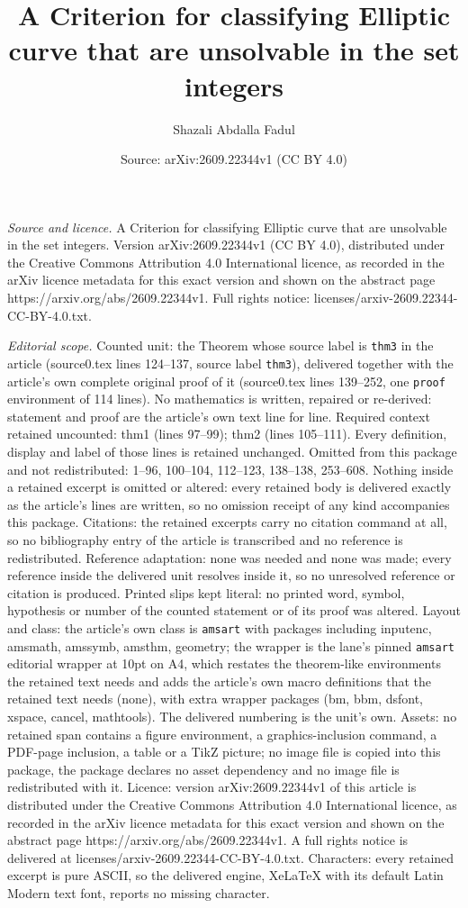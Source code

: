 \documentclass[10pt,a4paper]{amsart}
\title[A Criterion for classifying Elliptic curve that are unsolvab]{A Criterion for classifying Elliptic curve that are unsolvable in the set integers}
\author{Shazali Abdalla Fadul}
\date{Source: arXiv:2609.22344v1 (CC BY 4.0)}
\begin{document}
\maketitle

\noindent\emph{Source and licence.} A Criterion for classifying Elliptic curve that are unsolvable in the set integers. Version arXiv:2609.22344v1 (CC BY 4.0), distributed under the Creative Commons Attribution 4.0 International licence, as recorded in the arXiv licence metadata for this exact version and shown on the abstract page https://arxiv.org/abs/2609.22344v1. Full rights notice: licenses/arxiv-2609.22344-CC-BY-4.0.txt.\par\smallskip

\noindent\textit{Editorial scope.} Counted unit: the Theorem whose source label is \texttt{thm3} in the article (source0.tex lines 124--137, source label \texttt{thm3}), delivered together with the article's own complete original proof of it (source0.tex lines 139--252, one \texttt{proof} environment of 114 lines). No mathematics is written, repaired or re-derived: statement and proof are the article's own text line for line. Required context retained uncounted: thm1 (lines 97--99); thm2 (lines 105--111). Every definition, display and label of those lines is retained unchanged. Omitted from this package and not redistributed: 1--96, 100--104, 112--123, 138--138, 253--608. Nothing inside a retained excerpt is omitted or altered: every retained body is delivered exactly as the article's lines are written, so no omission receipt of any kind accompanies this package. Citations: the retained excerpts carry no citation command at all, so no bibliography entry of the article is transcribed and no reference is redistributed. Reference adaptation: none was needed and none was made; every reference inside the delivered unit resolves inside it, so no unresolved reference or citation is produced. Printed slips kept literal: no printed word, symbol, hypothesis or number of the counted statement or of its proof was altered. Layout and class: the article's own class is \texttt{amsart} with packages including inputenc, amsmath, amssymb, amsthm, geometry; the wrapper is the lane's pinned \texttt{amsart} editorial wrapper at 10pt on A4, which restates the theorem-like environments the retained text needs and adds the article's own macro definitions that the retained text needs (none), with extra wrapper packages (bm, bbm, dsfont, xspace, cancel, mathtools). The delivered numbering is the unit's own. Assets: no retained span contains a figure environment, a graphics-inclusion command, a PDF-page inclusion, a table or a TikZ picture; no image file is copied into this package, the package declares no asset dependency and no image file is redistributed with it. Licence: version arXiv:2609.22344v1 of this article is distributed under the Creative Commons Attribution 4.0 International licence, as recorded in the arXiv licence metadata for this exact version and shown on the abstract page https://arxiv.org/abs/2609.22344v1. A full rights notice is delivered at licenses/arxiv-2609.22344-CC-BY-4.0.txt. Characters: every retained excerpt is pure ASCII, so the delivered engine, XeLaTeX with its default Latin Modern text font, reports no missing character.
\end{document}
